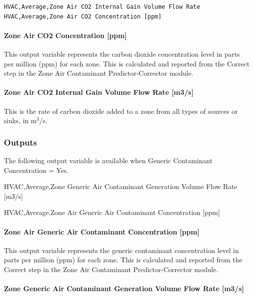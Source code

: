 \begin{lstlisting}
HVAC,Average,Zone Air CO2 Internal Gain Volume Flow Rate
HVAC,Average,Zone Air CO2 Concentration [ppm]
\end{lstlisting}

\paragraph{Zone Air CO2 Concentration {[}ppm{]}}\label{zone-air-co2-concentration-ppm}

This output variable represents the carbon dioxide concentration level in parts per million (ppm) for each zone. This is calculated and reported from the Correct step in the Zone Air Contaminant Predictor-Corrector module.

\paragraph{Zone Air CO2 Internal Gain Volume Flow Rate {[}m3/s{]}}\label{zone-air-co2-internal-gain-volume-flow-rate-m3s}

This is the rate of carbon dioxide added to a zone from all types of sources or sinks, in m\(^{3}\)/s.

\subsubsection{Outputs}\label{outputs-1-024}

The following output variable is available when Generic Contaminant Concentration = Yes.

HVAC,Average,Zone Generic Air Contaminant Generation Volume Flow Rate {[}m3/s{]}

HVAC,Average,Zone Air Generic Air Contaminant Concentration {[}ppm{]}

\paragraph{Zone Air Generic Air Contaminant Concentration {[}ppm{]}}\label{zone-air-generic-air-contaminant-concentration-ppm}

This output variable represents the generic contaminant concentration level in parts per million (ppm) for each zone. This is calculated and reported from the Correct step in the Zone Air Contaminant Predictor-Corrector module.

\paragraph{Zone Generic Air Contaminant Generation Volume Flow Rate {[}m3/s{]}}\label{zone-generic-air-contaminant-generation-volume-flow-rate-m3s}

